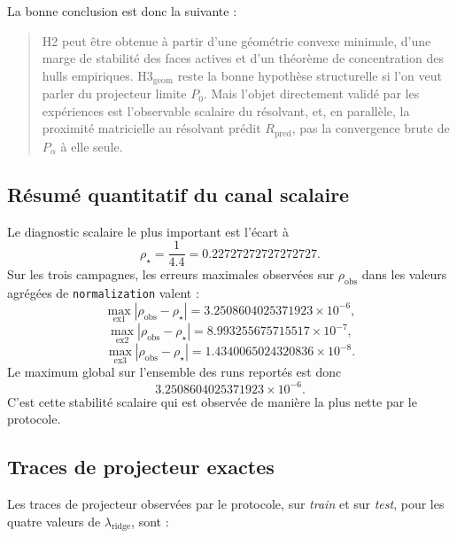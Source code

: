 La bonne conclusion est donc la suivante :

\begin{quote}
H2 peut être obtenue à partir d'une géométrie convexe minimale, d'une marge de stabilité des faces actives et d'un théorème de concentration des hulls empiriques.
H3\(_{\mathrm{geom}}\) reste la bonne hypothèse structurelle si l'on veut parler du projecteur limite \(P_0\).
Mais l'objet directement validé par les expériences est l'observable scalaire du résolvant, et, en parallèle, la proximité matricielle au résolvant prédit \(R_{\mathrm{pred}}\), pas la convergence brute de \(P_\alpha\) à elle seule.
\end{quote}

\subsection{Résumé quantitatif du canal scalaire}

Le diagnostic scalaire le plus important est l'écart à
\[
\rho_\star=\frac{1}{4.4}=0.22727272727272727.
\]
Sur les trois campagnes, les erreurs maximales observées sur \(\rho_{\mathrm{obs}}\) dans les valeurs agrégées de \texttt{normalization} valent :
\[
\max_{\mathrm{ex1}}|\rho_{\mathrm{obs}}-\rho_\star|
=
3.2508604025371923\times 10^{-6},
\]
\[
\max_{\mathrm{ex2}}|\rho_{\mathrm{obs}}-\rho_\star|
=
8.993255675715517\times 10^{-7},
\]
\[
\max_{\mathrm{ex3}}|\rho_{\mathrm{obs}}-\rho_\star|
=
1.4340065024320836\times 10^{-8}.
\]
Le maximum global sur l'ensemble des runs reportés est donc
\[
3.2508604025371923\times 10^{-6}.
\]
C'est cette stabilité scalaire qui est observée de manière la plus nette par le protocole.

\subsection{Traces de projecteur exactes}

Les traces de projecteur observées par le protocole, sur \emph{train} et sur \emph{test}, pour les quatre valeurs de \(\lambda_{\mathrm{ridge}}\), sont :

